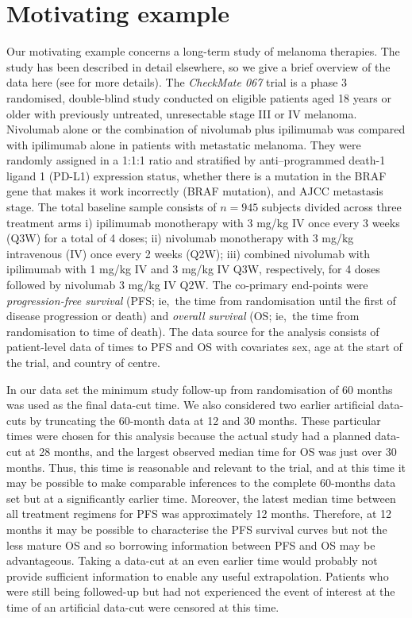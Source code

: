 \documentclass[AMA,STIX1COL]{WileyNJD-v2}
\begin{document}
\section{Motivating example}\label{sec:example}
Our motivating example concerns a long-term study of melanoma therapies.
The study has been described in detail elsewhere, so we give a brief overview of the data here (see \citep{Wolchok2017, Larkin2019, Hodi2018} for more details).
The \textit{CheckMate 067} trial is a phase 3 randomised, double-blind study conducted on eligible patients aged 18 years or older with previously untreated, unresectable stage III or IV melanoma.
Nivolumab alone or the combination of nivolumab plus ipilimumab was compared with ipilimumab alone in patients with metastatic melanoma.
They were randomly assigned in a 1:1:1 ratio and stratified by anti–programmed death-1 ligand 1 (PD-L1) expression status, whether there is a mutation in the BRAF gene that makes it work incorrectly (BRAF mutation), and AJCC metastasis stage.
The total baseline sample consists of $n = 945$ subjects divided across three treatment arms
i) ipilimumab monotherapy with 3 mg/kg IV once every 3 weeks (Q3W) for a total of 4 doses;
ii) nivolumab monotherapy with 3 mg/kg intravenous (IV) once every 2 weeks (Q2W);
iii) combined nivolumab with ipilimumab with 1 mg/kg IV and 3 mg/kg IV Q3W, respectively, for 4 doses followed by nivolumab 3 mg/kg IV Q2W.
The co-primary end-points were \textit{progression-free survival} (PFS; ie,~the time from randomisation until the first of disease progression or death) and \textit{overall survival} (OS; ie,~the time from randomisation to time of death).
The data source for the analysis consists of patient-level data of times to PFS and OS with covariates sex, age at the start of the trial, and country of centre.


In our data set the minimum study follow-up from randomisation of 60 months was used as the final data-cut time.
We also considered two earlier artificial data-cuts by truncating the 60-month data at 12 and 30 months.
These particular times were chosen for this analysis because the actual study had a planned data-cut at 28 months, and the largest observed median time for OS was just over 30 months. Thus, this time is reasonable and relevant to the trial, and at this time it may be possible to make comparable inferences to the complete 60-months data set but at a significantly earlier time.
Moreover, the latest median time between all treatment regimens for PFS was approximately 12 months. Therefore, at 12 months it may be possible to characterise the PFS survival curves but not the less mature OS and so borrowing information between PFS and OS may be advantageous. Taking a data-cut at an even earlier time would probably not provide sufficient information to enable any useful extrapolation.
Patients who were still being followed-up but had not experienced the event of interest at the time of an artificial data-cut were censored at this time.
\end{document}
